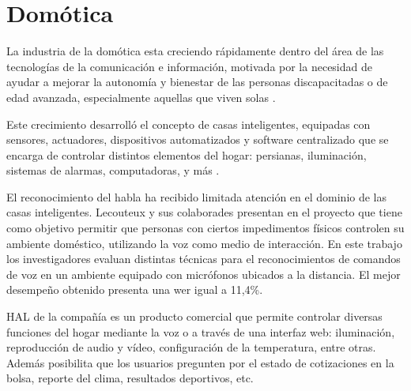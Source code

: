 \section{Dom\'otica}
\label{sec:domotica}

La industria de la dom\'otica esta creciendo r\'apidamente dentro del \'area de las tecnolog\'ias de la
comunicaci\'on e informaci\'on, motivada por la necesidad de ayudar a mejorar la autonom\'ia y bienestar 
de las personas discapacitadas o de edad avanzada, especialmente aquellas que viven solas 
\cite{AlshuVoice2011}.

Este crecimiento desarroll\'o el concepto de casas inteligentes, equipadas con sensores, actuadores, 
dispositivos automatizados y software centralizado que se encarga de controlar distintos elementos del 
hogar: persianas, iluminaci\'on, sistemas de alarmas, computadoras, y 
m\'as \cite{LecouteuxSpeech2011, UshaWireless2012}.

El reconocimiento del habla ha recibido limitada atenci\'on en el dominio de las casas inteligentes. 
Lecouteux y sus colaborades presentan en \cite{LecouteuxSpeech2011} el proyecto  que 
tiene como objetivo permitir que personas con ciertos impedimentos f\'isicos controlen su ambiente 
dom\'estico, utilizando la voz como medio de interacci\'on. En este trabajo los investigadores evaluan 
distintas t\'ecnicas para el reconocimientos
de comandos de voz en un ambiente equipado con micr\'ofonos ubicados a la distancia. El mejor desempe\~no 
obtenido presenta una \gls{wer} igual a 11,4\%.

HAL \cite{HAL} de la compa\~n\'ia  es un producto comercial que permite
controlar diversas funciones del hogar mediante la voz o a trav\'es de una interfaz web: 
iluminaci\'on, reproducci\'on de audio y v\'ideo, configuraci\'on de la temperatura, entre otras.
Adem\'as posibilita que los usuarios pregunten por el estado de cotizaciones en la 
bolsa, reporte del clima, resultados deportivos, etc.
